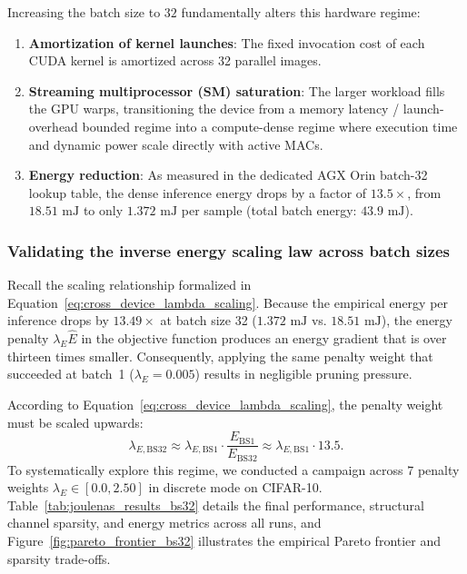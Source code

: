 Increasing the batch size to $32$ fundamentally alters this hardware regime:
\begin{enumerate}
    \item \textbf{Amortization of kernel launches}: The fixed invocation cost of each CUDA kernel is amortized across 32 parallel images.
    \item \textbf{Streaming multiprocessor (SM) saturation}: The larger workload fills the GPU warps, transitioning the device from a memory latency / launch-overhead bounded regime into a compute-dense regime where execution time and dynamic power scale directly with active MACs.
    \item \textbf{Energy reduction}: As measured in the dedicated AGX Orin batch-32 lookup table, the dense inference energy drops by a factor of $13.5\times$, from $18.51\text{ mJ}$ to only $1.372\text{ mJ}$ per sample (total batch energy: $43.9\text{ mJ}$).
\end{enumerate}

\subsubsection{Validating the inverse energy scaling law across batch sizes}

Recall the scaling relationship formalized in Equation~\ref{eq:cross_device_lambda_scaling}. Because the empirical energy per inference drops by $13.49\times$ at batch size 32 ($1.372\text{ mJ}$ vs. $18.51\text{ mJ}$), the energy penalty $\lambda_E \widehat{E}$ in the objective function produces an energy gradient that is over thirteen times smaller. Consequently, applying the same penalty weight that succeeded at batch~1 ($\lambda_E = 0.005$) results in negligible pruning pressure.

According to Equation~\ref{eq:cross_device_lambda_scaling}, the penalty weight must be scaled upwards:
\begin{equation}
\lambda_{E, \text{BS32}} \approx \lambda_{E, \text{BS1}} \cdot \frac{E_{\text{BS1}}}{E_{\text{BS32}}} \approx \lambda_{E, \text{BS1}} \cdot 13.5.
\end{equation}
To systematically explore this regime, we conducted a campaign across 7 penalty weights $\lambda_E \in [0.0, 2.50]$ in discrete mode on CIFAR-10. Table~\ref{tab:joulenas_results_bs32} details the final performance, structural channel sparsity, and energy metrics across all runs, and Figure~\ref{fig:pareto_frontier_bs32} illustrates the empirical Pareto frontier and sparsity trade-offs.

